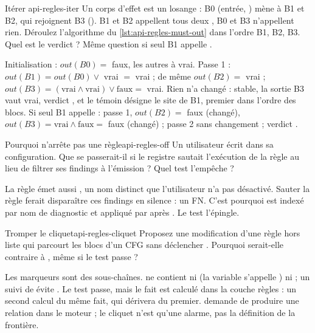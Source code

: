 \begin{exercice}{Itérer }{api-regles-iter}
Un corps d'effet est un losange : B0 (entrée, ) mène à B1 et B2, qui rejoignent B3 (). B1 et B2 appellent tous deux , B0 et B3 n'appellent rien. Déroulez l'algorithme du \cref{lst:api-regles-must-out} dans l'ordre B1, B2, B3. Quel est le verdict ? Même question si seul B1 appelle .
\end{exercice}
\begin{solution}
Initialisation : $\mathit{out}(B0) = $ faux, les autres à vrai. Passe 1 : $\mathit{out}(B1) = \mathit{out}(B0) \vee$ vrai $=$ vrai ; de même $\mathit{out}(B2) =$ vrai ; $\mathit{out}(B3) = (\text{vrai} \wedge \text{vrai}) \vee \text{faux} =$ vrai. Rien n'a changé : stable, la sortie B3 vaut vrai, verdict , et le témoin désigne le site de B1, premier dans l'ordre des blocs. Si seul B1 appelle : passe 1, $\mathit{out}(B2) = $ faux (changé), $\mathit{out}(B3) = \text{vrai} \wedge \text{faux} =$ faux (changé) ; passe 2 sans changement ; verdict .
\end{solution}

\begin{exercice}{Pourquoi  n'arrête pas une règle}{api-regles-off}
Un utilisateur écrit  dans sa configuration. Que se passerait-il si le registre sautait l'exécution de la règle  au lieu de filtrer ses findings à l'émission ? Quel test l'empêche ?
\end{exercice}
\begin{solution}
La règle émet aussi , un nom distinct que l'utilisateur n'a pas désactivé. Sauter la règle ferait disparaître ces findings en silence : un FN. C'est pourquoi  est indexé par nom de diagnostic et appliqué par  après . Le test  l'épingle.
\end{solution}

\begin{exercice}{Tromper le cliquet}{api-regles-cliquet}
Proposez une modification d'une règle hors liste qui parcourt les blocs d'un CFG sans déclencher . Pourquoi serait-elle contraire à , même si le test passe ?
\end{exercice}
\begin{solution}
Les marqueurs sont des sous-chaînes.  ne contient ni  (la variable s'appelle ) ni  ; un  suivi de  évite . Le test passe, mais le fait est calculé dans la couche règles : un second calcul du même fait, qui dérivera du premier.  demande de produire une relation dans le moteur ; le cliquet n'est qu'une alarme, pas la définition de la frontière.
\end{solution}

